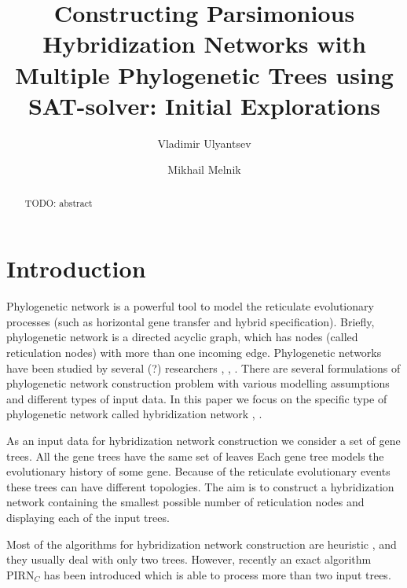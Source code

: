 \documentclass[runningheads, envcountsame, a4paper]{llncs}
\begin{document}
\mainmatter           
\title{Constructing Parsimonious Hybridization Networks with Multiple Phylogenetic Trees using SAT-solver: Initial Explorations}
\titlerunning{ } 
\toctitle{ }

\author{Vladimir Ulyantsev \and Mikhail Melnik}

\maketitle
\setcounter{footnote}{0}

\begin{abstract}
  TODO: abstract

\end{abstract}

\section{Introduction}

Phylogenetic network is a powerful tool to model the reticulate
evolutionary processes (such as horizontal gene transfer and hybrid specification).
Briefly, phylogenetic network is a directed acyclic graph, which has
nodes (called reticulation nodes) with more than one incoming edge. Phylogenetic
networks have been studied by several (?) researchers \cite{huson2010phylogenetic}, \cite{morrison2011introduction}, 
\cite{nakhleh2011evolutionary}. There are several formulations of phylogenetic network
construction problem with various modelling assumptions and different types of input data. 
In this paper we focus on the specific type of phylogenetic network called hybridization
network \cite{semple2006hybridization}, \cite{chen2010hybridnet}.

As an input data for hybridization network construction we consider a set of gene trees. 
All the gene trees have the same set of leaves
Each gene tree models the evolutionary history of some gene. 
Because of the reticulate evolutionary events these trees can have different topologies.
The aim is to construct a hybridization network containing the smallest possible number of 
reticulation nodes and displaying each of the input trees. 

Most of the algorithms for hybridization network construction are heuristic \cite{wu2013algorithm}, \cite{park2012murpar} 
and they usually deal with only two trees.
However, recently an exact algorithm PIRN$_C$ has been introduced \cite{wu2013algorithm} which is able to process more than two input trees.
\end{document}
